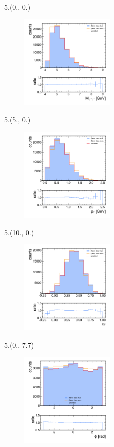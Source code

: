 \documentclass[10pt, xcolor={dvipsnames}, sans, mathserif, aspectratio=169]{beamer}
\newenvironment{Pic}[2]
{\begin{textblock}{#1}#2
\begin{figure}}
{\end{figure}
\end{textblock}}
\begin{document}
\begin{frame}

\begin{Pic}{5.}{(0., 0.)}
	\includegraphics[width=4.5cm]{omnifold_mass.png}
\end{Pic}

\begin{Pic}{5.}{(5., 0.)}
	\includegraphics[width=4.5cm]{omnifold_pT.png}
\end{Pic}

\begin{Pic}{5.}{(10., 0.)}
	\includegraphics[width=4.5cm]{omnifold_xF.png}
\end{Pic}

\begin{Pic}{5.}{(0., 7.7)}
	\includegraphics[width=4.5cm]{omnifold_phi.png}
\end{Pic}


\end{frame}
\end{document}
